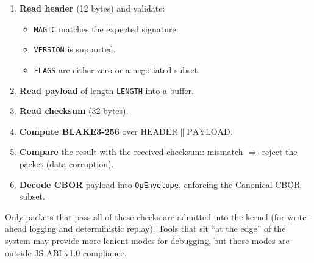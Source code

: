\begin{enumerate}
  \item \textbf{Read header} (12 bytes) and validate:
    \begin{itemize}
      \item \texttt{MAGIC} matches the expected signature.
      \item \texttt{VERSION} is supported.
      \item \texttt{FLAGS} are either zero or a negotiated subset.
    \end{itemize}
  \item \textbf{Read payload} of length \texttt{LENGTH} into a buffer.
  \item \textbf{Read checksum} (32 bytes).
  \item \textbf{Compute BLAKE3-256} over
    \(\mathrm{HEADER} \parallel \mathrm{PAYLOAD}\).
  \item \textbf{Compare} the result with the received checksum:
    mismatch $\Rightarrow$ reject the packet (data corruption).
  \item \textbf{Decode CBOR} payload into \texttt{OpEnvelope}, enforcing
    the Canonical CBOR subset.
\end{enumerate}

Only packets that pass all of these checks are admitted into the kernel (for
write-ahead logging and deterministic replay). Tools that sit ``at the edge''
of the system may provide more lenient modes for debugging, but those modes
are outside JS-ABI v1.0 compliance.
